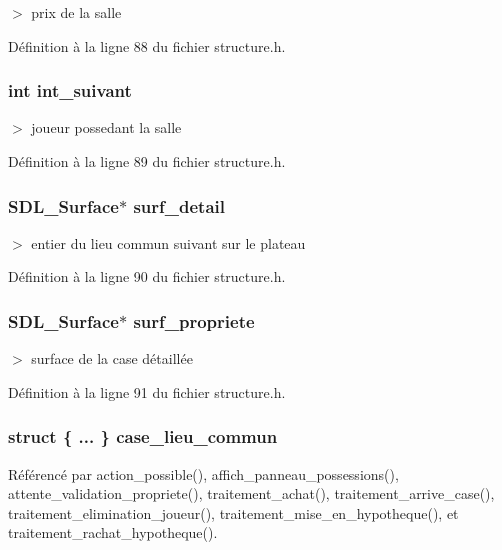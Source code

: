 $>$ prix de la salle 



D\'{e}finition \`{a} la ligne 88 du fichier structure.h.
\subsubsection{\setlength{\rightskip}{0pt plus 5cm}int {\bf int\_\-suivant}}\label{structcases_2f2703ed773d0828dbf321a39949b948}


$>$ joueur possedant la salle 



D\'{e}finition \`{a} la ligne 89 du fichier structure.h.
\subsubsection{\setlength{\rightskip}{0pt plus 5cm}SDL\_\-Surface$\ast$ {\bf surf\_\-detail}}\label{structcases_fe23bd51c8293f90f42d24e9cbd01578}


$>$ entier du lieu commun suivant sur le plateau 



D\'{e}finition \`{a} la ligne 90 du fichier structure.h.
\subsubsection{\setlength{\rightskip}{0pt plus 5cm}SDL\_\-Surface$\ast$ {\bf surf\_\-propriete}}\label{structcases_53156a5bfb684b6baa312d215af30777}


$>$ surface de la case d\'{e}taill\'{e}e 



D\'{e}finition \`{a} la ligne 91 du fichier structure.h.
\subsubsection{\setlength{\rightskip}{0pt plus 5cm}struct \{ ... \}  {\bf case\_\-lieu\_\-commun}}\label{structcases_f1240a8ba861b5871a50cdb7e5039a1e}




R\'{e}f\'{e}renc\'{e} par action\_\-possible(), affich\_\-panneau\_\-possessions(), attente\_\-validation\_\-propriete(), traitement\_\-achat(), traitement\_\-arrive\_\-case(), traitement\_\-elimination\_\-joueur(), traitement\_\-mise\_\-en\_\-hypotheque(), et traitement\_\-rachat\_\-hypotheque().
